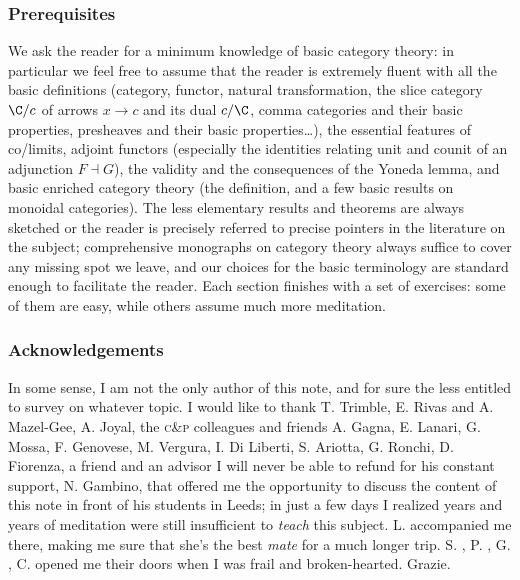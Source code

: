\subsubsection*{\bf Prerequisites}
We ask the reader for a minimum knowledge of basic category theory: in particular we feel free to assume that the reader is extremely fluent with all the basic definitions (category, functor, natural transformation, the slice category $\C/c$ of arrows $x\to c$ and its dual $c/\C$, comma categories and their basic properties, presheaves and their basic properties\dots), the essential features of co/limits, adjoint functors (especially the identities relating unit and counit of an adjunction $F\dashv G$), the validity and the consequences of the Yoneda lemma, and basic enriched category theory (the definition, and a few basic results on monoidal categories). The less elementary results and theorems are always sketched or the reader is precisely referred to precise pointers in the literature on the subject; comprehensive monographs on category theory always suffice to cover any missing spot we leave, and our choices for the basic terminology are standard enough to facilitate the reader. Each section finishes with a set of exercises: some of them are easy, while others assume much more meditation.
\subsubsection*{\bf Acknowledgements}
In some sense, I am not the only author of this note, and for sure the less entitled to survey on whatever topic. I would like to thank {\sf T\@. Trimble}, {\sf E\@. Rivas} and {\sf A\@. Mazel\hyp{}Gee}, {\sf A\@. Joyal}, the \textsc{c}\&\textsc{p} colleagues and friends {\sf A\@. Gagna}, {\sf E\@. Lanari}, {\sf G\@. Mossa}, {\sf F\@. Genovese}, {\sf M\@. Vergura}, {\sf I\@. Di Liberti}, {\sf S\@. Ariotta}, {\sf G\@. Ronchi}, {\sf D\@. Fiorenza}, a friend and an advisor I will never be able to refund for his constant support, {\sf N\@. Gambino}, that offered me the opportunity to discuss the content of this note in front of his students in Leeds; in just a few days I realized years and years of meditation were still insufficient to \emph{teach} this subject. L\@. accompanied me there, making me sure that she's the best \emph{mate} for a much longer trip. 
\textsf{S\@.}%
, \textsf{P\@.}%
, \textsf{G\@.}%
, \textsf{C\@.} %
opened me their doors when I was frail and broken\hyp{}hearted. Grazie.